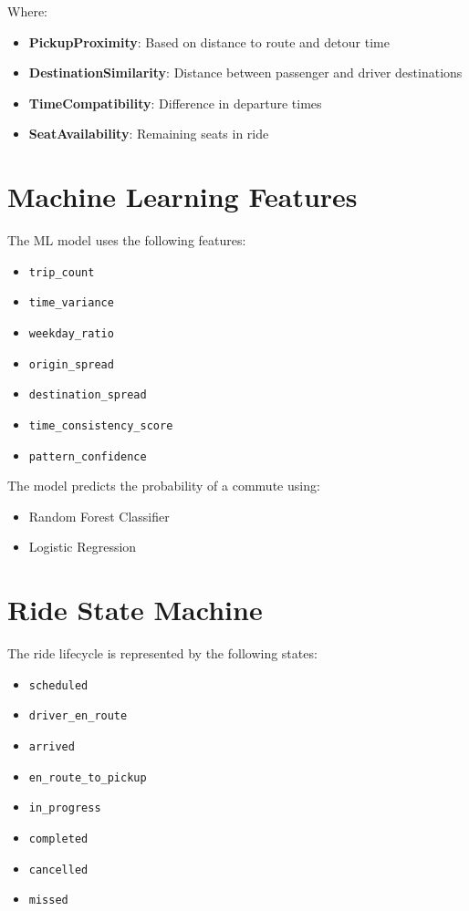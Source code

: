 Where:

\begin{itemize}
    \item \textbf{PickupProximity}: Based on distance to route and detour time
    \item \textbf{DestinationSimilarity}: Distance between passenger and driver destinations
    \item \textbf{TimeCompatibility}: Difference in departure times
    \item \textbf{SeatAvailability}: Remaining seats in ride
\end{itemize}

\section{Machine Learning Features}

The ML model uses the following features:

\begin{itemize}
    \item \texttt{trip\_count}
    \item \texttt{time\_variance}
    \item \texttt{weekday\_ratio}
    \item \texttt{origin\_spread}
    \item \texttt{destination\_spread}
    \item \texttt{time\_consistency\_score}
    \item \texttt{pattern\_confidence}
\end{itemize}

The model predicts the probability of a commute using:

\begin{itemize}
    \item Random Forest Classifier
    \item Logistic Regression
\end{itemize}

\section{Ride State Machine}

The ride lifecycle is represented by the following states:

\begin{itemize}
    \item \texttt{scheduled}
    \item \texttt{driver\_en\_route}
    \item \texttt{arrived}
    \item \texttt{en\_route\_to\_pickup}
    \item \texttt{in\_progress}
    \item \texttt{completed}
    \item \texttt{cancelled}
    \item \texttt{missed}
\end{itemize}

